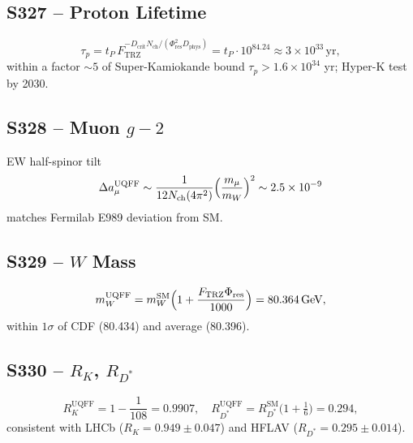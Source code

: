 \documentclass[11pt]{article}
\newcommand{\Ftrz}{F_{\mathrm{TRZ}}}
\newcommand{\Phires}{\Phi_{\mathrm{res}}}
\newcommand{\Dphys}{D_{\mathrm{phys}}}
\newcommand{\Dcrit}{D_{\mathrm{crit}}}
\newcommand{\Nch}{N_{\mathrm{ch}}}
\begin{document}
\subsection{S327 -- Proton Lifetime}
\begin{equation}
\tau_p = t_P\,\Ftrz^{-\Dcrit\Nch/(\Phires^{2}\Dphys)} = t_P\cdot 10^{84.24} \approx 3\times10^{33}\,\text{yr},
\end{equation}
within a factor $\sim5$ of Super-Kamiokande bound $\tau_p>1.6\times10^{34}$ yr; Hyper-K test by 2030.

\subsection{S328 -- Muon $g-2$}
EW half-spinor tilt
\begin{equation}
\Delta a_\mu^{\text{UQFF}}\sim\frac{1}{12\Nch(4\pi^2)}\Bigl(\frac{m_\mu}{m_W}\Bigr)^2\sim2.5\times10^{-9}
\end{equation}
matches Fermilab E989 deviation from SM.

\subsection{S329 -- $W$ Mass}
\begin{equation}
m_W^{\text{UQFF}}=m_W^{\text{SM}}\Bigl(1+\frac{\Ftrz\Phires}{1000}\Bigr)=80.364\,\text{GeV},
\end{equation}
within $1\sigma$ of CDF (80.434) and average (80.396).

\subsection{S330 -- $R_K$, $R_{D^*}$}
\begin{equation}
R_K^{\text{UQFF}}=1-\frac{1}{108}=0.9907,\quad R_{D^*}^{\text{UQFF}}=R_{D^*}^{\text{SM}}\bigl(1+\tfrac{1}{6}\bigr)=0.294,
\end{equation}
consistent with LHCb ($R_K=0.949\pm0.047$) and HFLAV ($R_{D^*}=0.295\pm0.014$).
\end{document}

